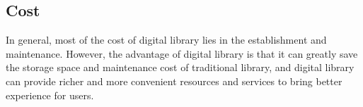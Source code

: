\subsection{Cost}
In general, most of the cost of digital library lies in the establishment and maintenance. However, the advantage of digital library is that it can greatly save the storage space and maintenance cost of traditional library, and digital library can provide richer and more convenient resources and services to bring better experience for users.
 
